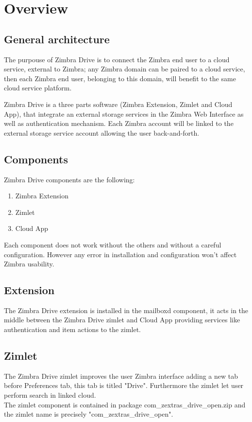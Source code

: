 \section{Overview}
\subsection{General architecture}\label{subsec:general architecture}
    The purpouse of Zimbra Drive is to connect the Zimbra end user to a cloud service, external to Zimbra;
    any Zimbra domain can be paired to a cloud service, then each Zimbra end user, belonging to this domain,
    will benefit to the same cloud service platform.

    Zimbra Drive is a three parts software (Zimbra Extension, Zimlet and Cloud App),
    that integrate an external storage services in the Zimbra Web Interface as well as authentication mechanism.
    Each Zimbra account will be linked to the external storage service account allowing the user back-and-forth.
%

\subsection{Components}
    Zimbra Drive components are the following:
    \begin{enumerate}
        \item Zimbra Extension
        \item Zimlet
        \item Cloud App
    \end{enumerate}
    \begin{warning}
        Each component does not work without the others and without a careful configuration.
        However any error in installation and configuration won't affect Zimbra usability.
    \end{warning}

        \subsection{Extension}
        The Zimbra Drive extension is installed in the mailboxd component, it acts in the middle between the Zimbra
        Drive zimlet and Cloud App providing services like authentication and item actions to the zimlet.

        \subsection{Zimlet}
        The Zimbra Drive zimlet improves the user Zimbra interface adding a new tab before Preferences tab,
        this tab is titled "Drive". Furthermore the zimlet let user perform search in linked cloud.\\
        The zimlet component is contained in package com\_zextras\_drive\_open.zip and the zimlet name is precisely
        "com\_zextras\_drive\_open".


